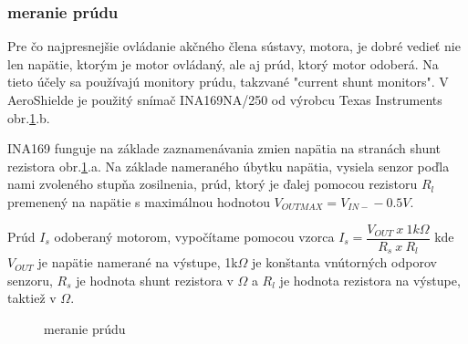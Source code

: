 \subsubsection{meranie prúdu}
\label{merprud}

Pre čo najpresnejšie ovládanie akčného člena sústavy, motora, je dobré vedieť nie len napätie, ktorým je motor ovládaný, ale aj prúd, ktorý motor odoberá. Na tieto účely sa používajú monitory prúdu, takzvané "current shunt monitors". V AeroShielde je použitý snímač INA169NA/250 od výrobcu Texas Instruments obr.\ref{OBRAZOK 2.3}.b.

INA169 funguje na základe zaznamenávania zmien napätia na stranách shunt rezistora obr.\ref{OBRAZOK 2.3}.a. Na základe nameraného úbytku napätia, vysiela senzor poďla nami zvoleného stupňa zosilnenia, prúd, ktorý je ďalej pomocou rezistoru $R_{l}$ premenený na napätie s maximálnou hodnotou $V_{OUTMAX} = V_{IN-} - 0.5V $.

 Prúd $I_{s}$ odoberaný motorom, vypočítame pomocou vzorca $I_{s} = \dfrac{V_{OUT}\: x \: 1k\Omega}{R_{s} \: x \: R_{l}} $ kde $V_{OUT}$ je napätie namerané na výstupe, 1k$\Omega$ je konštanta vnútorných odporov senzoru, $R_{s}$ je hodnota shunt rezistora v $\Omega$ a $R_{l}$ je hodnota rezistora na výstupe, taktiež v $\Omega$\cite{INA}.

\begin{figure}[!tbh]
\hfill
{}
\hfill
{}
\hfill
\caption{meranie prúdu}\label{OBRAZOK 2.3}
\end{figure}


\label{Hall}
\pagebreak


